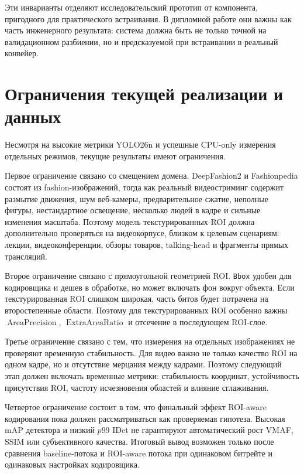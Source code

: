 \documentclass[12pt,a4paper,oneside,openany]{report}
\begin{document}
Эти инварианты отделяют исследовательский прототип от компонента, пригодного для практического встраивания. В дипломной работе они важны как часть инженерного результата: система должна быть не только точной на валидационном разбиении, но и предсказуемой при встраивании в реальный конвейер.


\section{Ограничения текущей реализации и данных}

Несмотря на высокие метрики YOLO26n и успешные CPU-only измерения отдельных режимов, текущие результаты имеют ограничения.

Первое ограничение связано со смещением домена. DeepFashion2 и Fashionpedia состоят из fashion-изображений, тогда как реальный видеостриминг содержит размытие движения, шум веб-камеры, предварительное сжатие, неполные фигуры, нестандартное освещение, несколько людей в кадре и сильные изменения масштаба. Поэтому модель текстурированных ROI должна дополнительно проверяться на видеокорпусе, близком к целевым сценариям: лекции, видеоконференции, обзоры товаров, talking-head и фрагменты прямых трансляций.

Второе ограничение связано с прямоугольной геометрией ROI. \texttt{Bbox} удобен для кодировщика и дешев в обработке, но может включать фон вокруг объекта. Если текстурированная ROI слишком широкая, часть битов будет потрачена на второстепенные области. Поэтому для текстурированных ROI особенно важны $\operatorname{AreaPrecision}$, $\operatorname{ExtraAreaRatio}$ и отсечение в последующем ROI-слое.

Третье ограничение связано с тем, что измерения на отдельных изображениях не проверяют временную стабильность. Для видео важно не только качество ROI на одном кадре, но и отсутствие мерцания между кадрами. Поэтому следующий этап должен включать временные метрики: стабильность координат, устойчивость присутствия ROI, частоту исчезновения областей и влияние сглаживания.

Четвертое ограничение состоит в том, что финальный эффект ROI-aware кодирования пока должен рассматриваться как проверяемая гипотеза. Высокая mAP детектора и низкий $p99$ IDet не гарантируют автоматический рост VMAF, SSIM или субъективного качества. Итоговый вывод возможен только после сравнения baseline-потока и ROI-aware потока при одинаковом битрейте и одинаковых настройках кодировщика.
\end{document}
